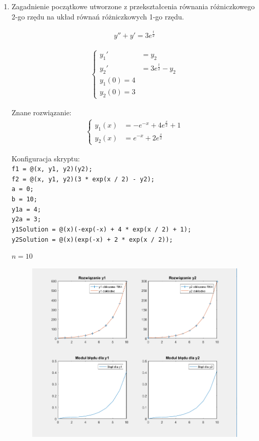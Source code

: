 \documentclass[12pt]{article}
\begin{document}
	\begin{enumerate}[label=\textbf{Przykład \arabic*}]
		\item 
		\label{example-changingN-1}
		Zagadnienie początkowe utworzone z przekształcenia równania różniczkowego 2-go rzędu na układ równań różniczkowych 1-go rzędu.
		
		\begin{align*}
			y'' + y' = 3e^{\frac{t}{2}}
		\end{align*}
		
		\begin{align*}
		\begin{cases}
			y_1' &= y_2 \\
			y_2' &= 3e^{\frac{t}{2}} - y_2 \\
			y_1(0) = 4 \\
			y_2(0) = 3
		\end{cases}
		\end{align*}
		
		Znane rozwiązanie:
		\begin{align*}
		\begin{cases}
			y_1(x) &= -e^{-x} + 4e^{\frac{x}{2}} + 1 \\
			y_2(x) &= e^{-x} + 2e^{\frac{x}{2}}
		\end{cases}
		\end{align*}
		
		Konfiguracja skryptu: \\
		\texttt{f1 = @(x, y1, y2)(y2);	\\
		f2 = @(x, y1, y2)(3 * exp(x / 2) - y2);\\
		a = 0;\\
		b = 10;\\
		y1a = 4;\\
		y2a = 3;\\	
		y1Solution = @(x)(-exp(-x) + 4 * exp(x / 2) + 1); \\
		y2Solution = @(x)(exp(-x) + 2 * exp(x / 2));
		}
	
		$n = 10$
	
		\begin{figure}[H]
			\centering
			\includegraphics[scale=0.7]{images/example-1.png}
		\end{figure}
	

\end{enumerate}
\end{document}
